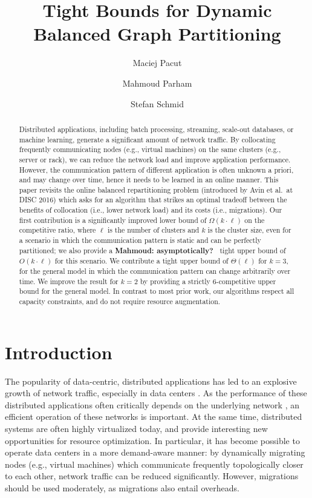 \documentclass[a4paper,anonymous,USenglish]{lipics-v2019}
\title{Tight Bounds for Dynamic Balanced Graph Partitioning}
\author{Maciej Pacut}{maciej.pacut@univie.ac.at}{Faculty of Computer Science, University of Vienna,Austria}{0000-0002-6379-1490}{}
\author{Mahmoud Parham}{mahmoud.parham@univie.ac.at}{Faculty of Computer Science, University of Vienna, Austria}{0000-0002-6211-077X}{}
\author{Stefan Schmid}{stefan\_schmid@univie.ac.at}{Faculty of Computer Science, University of Vienna, Austria}{}{}
\newcommand\mahmoud[1]{\color{orange}\textbf{Mahmoud: #1~}\color{black}}
\begin{document}
\begin{abstract}
	Distributed   applications,  including  batch  processing, streaming, scale-out databases,
	or machine learning, generate a significant amount of network traffic.
	By collocating frequently communicating nodes (e.g., virtual machines) on the same clusters (e.g., server or rack), we can reduce the network load and  improve application performance. 
	However, the communication pattern of different application is often unknown a priori, and may change over time, hence it needs to be learned in an online manner.
	This paper revisits the online 
	balanced repartitioning problem 
	(introduced by Avin et al.~at DISC 2016)
	which asks for an algorithm that strikes
	an optimal tradeoff between the benefits
	of collocation (i.e., lower network load) 
	and its costs (i.e., migrations). 
	Our first contribution is a significantly improved
	lower bound of $\Omega(k\cdot \ell)$ on the
	competitive ratio, where $\ell$ is the number
	of clusters and $k$ is the cluster size,
	even for a scenario in which the communication
	pattern is static and can be perfectly partitioned;
	we also provide a \mahmoud{asymptotically?} tight upper bound 
	of $O(k\cdot \ell)$ for this scenario.
	We contribute a tight upper bound
	of $\Theta(\ell)$ for $k=3$,
	for the general model in which the
	communication pattern can change arbitrarily
	over time.
	We improve the result for $k=2$ by providing a strictly $6$-competitive upper bound for the general model.
	In contrast to most prior work, our algorithms respect all capacity constraints, and do not require resource augmentation.
	
\end{abstract}

\maketitle



\section{Introduction}


The popularity of data-centric, distributed applications has led to an explosive growth of network traffic, especially in data centers \cite{roy2015inside,singh2015jupiter}.
As the performance of these distributed applications often critically depends on the underlying network \cite{mogul2012we}, an efficient operation of these networks is important.
At the same time, distributed systems are often highly virtualized today, and provide interesting new opportunities for resource optimization.
In particular, it has become possible to operate data centers in a more demand-aware manner: 
by dynamically migrating nodes (e.g., virtual machines) which communicate frequently topologically closer to each other, network traffic can be reduced significantly.  
However, migrations should be used moderately, as migrations also entail overheads. 
\end{document}
